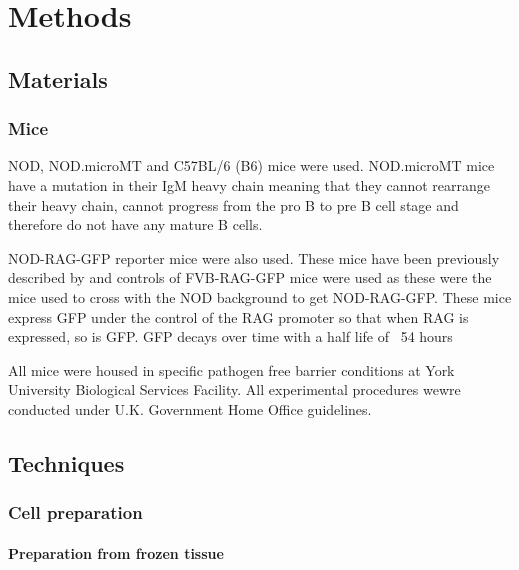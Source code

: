 
\chapter{Methods}

\section{Materials}

\subsection{Mice}
\label{methods:mice}

NOD, NOD.microMT \citep{Kitamura1991} and C57BL/6 (B6) mice were used.
NOD.microMT mice have a mutation in their IgM heavy chain meaning that they cannot rearrange their heavy chain, cannot progress from the pro B to pre B cell stage and therefore do not have any mature B cells.

NOD-RAG-GFP reporter mice were also used.
These mice have been previously described by  and controls of FVB-RAG-GFP mice were used as these were the mice used to cross with the NOD background to get NOD-RAG-GFP.
These mice express GFP under the control of the RAG promoter so that when RAG is expressed, so is GFP.
GFP decays over time with a half life of ~54 hours 

All mice were housed in specific pathogen free barrier conditions at York University Biological Services Facility. 
All experimental procedures wewre conducted under U.K. Government Home Office guidelines.



\section{Techniques}

\subsection{Cell preparation}

\subsubsection{Preparation from frozen tissue}


